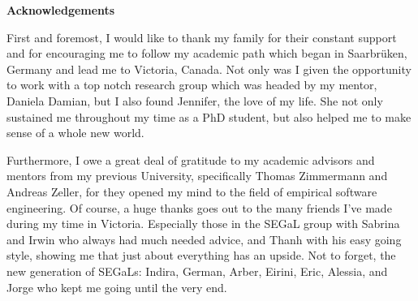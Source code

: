 \newpage
{}

\begin{center}
\textbf{Acknowledgements}
\end{center}

First and foremost, I would like to thank my family for their constant support and for encouraging me to follow my academic path which began in Saarbr{\"u}ken, Germany and lead me to Victoria, Canada.
%
Not only was I given the opportunity to work with a top notch research group which was headed by my mentor, Daniela Damian, but I also found Jennifer, the love of my life. She not only sustained me throughout my time as a PhD student, but also helped me to make sense of a whole new world.

Furthermore, I owe a great deal of gratitude to my academic advisors and mentors from my previous University, specifically Thomas Zimmermann and Andreas Zeller, for they opened my mind to the field of empirical software engineering.
%
Of course, a huge thanks goes out to the many friends I've made during my time in Victoria. Especially those in the SEGaL group with Sabrina and Irwin who always had much needed advice, and Thanh with his easy going style, showing me that just about everything has an upside.
Not to forget, the new generation of SEGaLs: Indira, German, Arber, Eirini, Eric, Alessia, and Jorge who kept me going until the very end.




